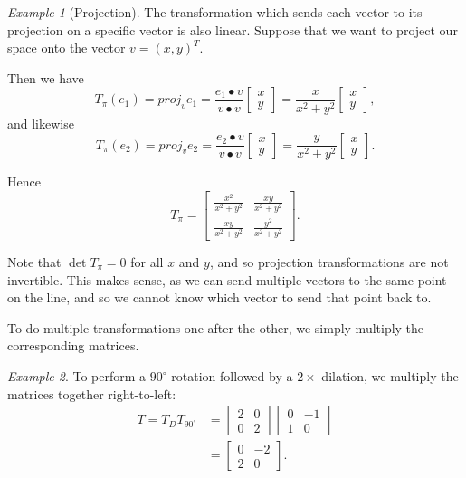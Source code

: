 \documentclass[10pt, a4paper]{amsart}
\newcommand{\vectorproj}[2][]{\textit{proj}_{#1} {#2}}
\theoremstyle{definition}
\theoremstyle{remark}
\newtheorem{ex}{Example}
\begin{document}
\begin{ex}[Projection]
  The transformation which sends each vector to its projection on a specific
  vector is also linear. Suppose that we want to project our space onto the vector $ v = (x,y)^T $.

  Then we have
  \begin{displaymath}
    T_\pi (e_1) = \vectorproj[v]{e_1} = \frac{e_1 \bullet v}{v \bullet v} \begin{bmatrix} x \\ y \end{bmatrix}
                                      = \frac{x}{x^2 + y^2} \begin{bmatrix} x \\ y \end{bmatrix},
  \end{displaymath}
  and likewise
  \begin{displaymath}
    T_\pi (e_2) = \vectorproj[v]{e_2} = \frac{e_2 \bullet v}{v \bullet v} \begin{bmatrix} x \\ y \end{bmatrix}
                                      = \frac{y}{x^2 + y^2} \begin{bmatrix} x \\ y \end{bmatrix}.
  \end{displaymath}

  Hence
  \begin{displaymath}
    T_\pi = \begin{bmatrix} \frac{x^2}{x^2 + y^2} & \frac{xy}{x^2 + y^2} \\ \frac{xy}{x^2 + y^2} & \frac{y^2}{x^2 + y^2} \end{bmatrix}.
  \end{displaymath}

  Note that $ \det{T_\pi} = 0 $ for all $ x $ and $ y $, and so projection transformations are not invertible.
  This makes sense, as we can send multiple vectors to the same point on the line, and so we cannot know which
  vector to send that point back to.
\end{ex}

To do multiple transformations one after the other, we simply multiply the corresponding matrices.

\begin{ex}
  To perform a $ 90^\circ $ rotation followed by a $ 2 \times $ dilation, we multiply the
  matrices together right-to-left:
  \begin{align*}
    T = T_D T_{90^\circ} &= \begin{bmatrix} 2 & 0 \\ 0 & 2 \end{bmatrix} \begin{bmatrix} 0 & -1 \\ 1 & 0 \end{bmatrix} \\
                         &= \begin{bmatrix} 0 & -2 \\ 2 & 0\end{bmatrix}.
  \end{align*}
\end{ex}
\end{document}
